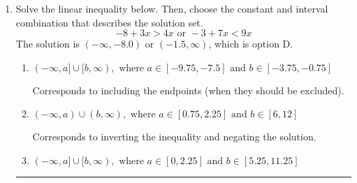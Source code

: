 \documentclass{extbook}[14pt]
\newcommand{\litem}[1]{\item #1

\rule{\textwidth}{0.4pt}}
\begin{document}
\begin{enumerate}
{\begin{enumerate}[label=\Alph*.]
$[2.60, -1.08)$, which is the correct interval but negatives of the actual endpoints.
\item \( (a, b], \text{ where } a \in [1.5, 5.25] \text{ and } b \in [-4.5, 0] \)

$(2.60, -1.08]$, which corresponds to flipping the inequality and getting negatives of the actual endpoints.
\item \( (-\infty, a) \cup [b, \infty), \text{ where } a \in [0.75, 6] \text{ and } b \in [-2.32, -0.82] \)

$(-\infty, 2.60) \cup [-1.08, \infty)$, which corresponds to displaying the and-inequality as an or-inequality AND flipping the inequality AND getting negatives of the actual endpoints.
\item \( (-\infty, a] \cup (b, \infty), \text{ where } a \in [0, 7.5] \text{ and } b \in [-1.57, -0.53] \)

$(-\infty, 2.60] \cup (-1.08, \infty)$, which corresponds to displaying the and-inequality as an or-inequality and getting negatives of the actual endpoints.
\item \( \text{None of the above.} \)

* This is correct as the answer should be $[-2.60, 1.08)$.
\end{enumerate}

\textbf{General Comment:} To solve, you will need to break up the compound inequality into two inequalities. Be sure to keep track of the inequality! It may be best to draw a number line and graph your solution.
}
\litem{
Solve the linear inequality below. Then, choose the constant and interval combination that describes the solution set.
\[ -8 + 3 x > 4 x \text{ or } -3 + 7 x < 9 x \]The solution is \( (-\infty, -8.0) \text{ or } (-1.5, \infty) \), which is option D.\begin{enumerate}[label=\Alph*.]
\item \( (-\infty, a] \cup [b, \infty), \text{ where } a \in [-9.75, -7.5] \text{ and } b \in [-3.75, -0.75] \)

Corresponds to including the endpoints (when they should be excluded).
\item \( (-\infty, a) \cup (b, \infty), \text{ where } a \in [0.75, 2.25] \text{ and } b \in [6, 12] \)

Corresponds to inverting the inequality and negating the solution.
\item \( (-\infty, a] \cup [b, \infty), \text{ where } a \in [0, 2.25] \text{ and } b \in [5.25, 11.25] \)


\end{enumerate}}
\end{enumerate}
\end{document}
